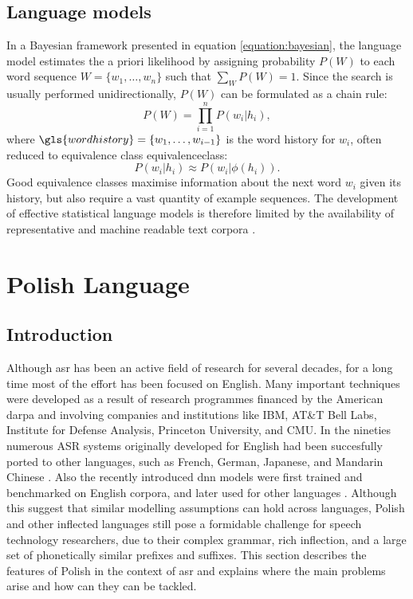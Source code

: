 \subsection{Language models}
\label{subsection:lm}
 In a Bayesian framework presented in equation \ref{equation:bayesian}, the language model estimates the a priori likelihood by assigning probability $P(W)$ to each word sequence $W=\{w_{1}, \ldots, w_{n}\}$ such that $\sum_{W}P(W)=1$. Since the search is usually performed unidirectionally, $P(W)$ can be formulated as a chain rule:
\begin{equation}
\label{equation:chain}
  P(W)=\prod^{n}_{i=1}P(w_{i}|h_{i}),
\end{equation}
where $\gls{wordhistory}=\{w_{1}, \ldots, w_{i-1}\}$ is the word history for $w_{i}$, often reduced to equivalence class \gls{equivalenceclass}:
\begin{equation}
  P(w_{i}|h_{i})\approx P(w_{i}|\phi(h_{i})).
\end{equation}
Good equivalence classes maximise information about the next word $w_{i}$ given its history, but also require a vast quantity of example sequences. The development of effective statistical language models is therefore limited by the availability of representative and machine readable text corpora \cite{rosenfeld2000two}.

\section{Polish Language}
\label{section:polish}
\subsection{Introduction}
Although \gls{asr} has been an active field of research for several decades, for a long time most of the effort has been focused on English.  Many important techniques were developed as a result of research programmes financed by the American \gls{darpa} and involving companies and institutions like IBM, AT\&T Bell Labs, Institute for Defense Analysis, Princeton University, and CMU. In the nineties numerous ASR systems originally developed for English had been succesfully ported to other languages, such as French, German, Japanese, and Mandarin Chinese \cite{besacier2014automatic}. Also the recently introduced \gls{dnn} models were first trained and benchmarked on English corpora, and later used for other languages \cite{hinton2012deep}. Although this suggest that similar modelling assumptions can hold across languages, Polish and other inflected languages still pose a formidable challenge for speech technology researchers, due to their complex grammar, rich inflection, and a large set of phonetically similar prefixes and suffixes. This section describes the features of Polish in the context of \gls{asr} and explains where the main problems arise and how can they can be tackled.
